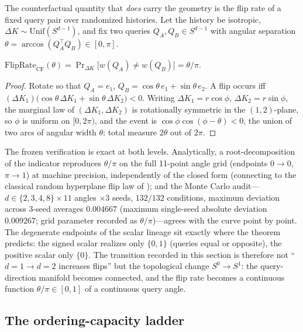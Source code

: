 The counterfactual quantity that \emph{does} carry the geometry is the flip
rate of a fixed query pair over randomized histories. Let the history be
isotropic, $\Delta K\sim\mathrm{Unif}(S^{d-1})$, and fix two queries
$Q_A,Q_B\in S^{d-1}$ with angular separation
$\theta=\arccos(Q_A^{\top}Q_B)\in[0,\pi]$.

\begin{proposition}
\label{prop:fliplaw}
$\mathrm{FlipRate}_{\mathrm{CF}}(\theta)
=\Pr_{\Delta K}\bigl[w(Q_A)\neq w(Q_B)\bigr]=\theta/\pi$.
\end{proposition}

\begin{proof}
Rotate so that $Q_A=e_1$, $Q_B=\cos\theta\,e_1+\sin\theta\,e_2$. A flip
occurs iff $(\Delta K_1)\bigl(\cos\theta\,\Delta K_1+\sin\theta\,\Delta
K_2\bigr)<0$. Writing $\Delta K_1=r\cos\phi$, $\Delta K_2=r\sin\phi$, the
marginal law of $(\Delta K_1,\Delta K_2)$ is rotationally symmetric in the
$(1,2)$-plane, so $\phi$ is uniform on $[0,2\pi)$, and the event is
$\cos\phi\cos(\phi-\theta)<0$, the union of two arcs of angular width
$\theta$: total measure $2\theta$ out of $2\pi$.
\end{proof}

The frozen verification is exact at both levels. Analytically, a
root-decomposition of the indicator reproduces $\theta/\pi$ on the full
11-point angle grid (endpoints $0\to0$, $\pi\to1$) at machine precision,
independently of the closed form (connecting to the classical random
hyperplane flip law of \citet{charikar2002}); and the Monte Carlo
audit---$d\in\{2,3,4,8\}\times11$ angles $\times3$ seeds, $132/132$
conditions, maximum deviation across 3-seed averages $0.004667$ (maximum
single-seed absolute deviation $0.009267$; grid parameter recorded as
$\theta/\pi$)---agrees with the curve point by point. The
degenerate endpoints of the scalar lineage sit exactly where the theorem
predicts: the signed scalar realizes only $\{0,1\}$ (queries equal or
opposite), the positive scalar only $\{0\}$. The transition recorded in
this section is therefore not ``$d=1\to d=2$ increases flips'' but the
topological change $S^{0}\to S^{1}$: the query-direction manifold becomes
connected, and the flip rate becomes a continuous function
$\theta/\pi\in[0,1]$ of a continuous query angle.

\subsection{The ordering-capacity ladder}
\label{sec:capacity}

